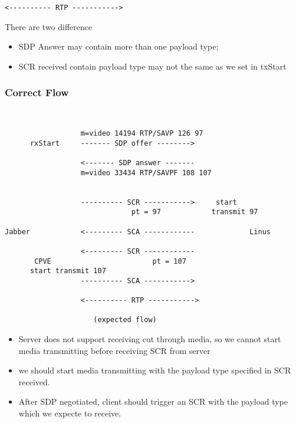 \documentclass{beamer}
\begin{document}
\begin{frame}[fragile]
\begin{center}
\begin{BVerbatim}[fontfamily=courier, fontsize=\relsize{-5}, commandchars=\\\{\}]
                                                                                        <---------- RTP ----------->            

\end{BVerbatim}
\end{center}
{
There are two difference 
\begin{itemize}
    \item SDP Answer may contain more than one payload type;
    \item SCR received contain payload type may not the same as we set in txStart
\end{itemize}
}
\end{frame}


\begin{frame}[fragile]
  \frametitle{Correct Flow}

\begin{center}
\begin{BVerbatim}[fontfamily=courier, fontsize=\relsize{-4}]


                  m=video 14194 RTP/SAVP 126 97                            
      rxStart     ------- SDP offer -------->        
                                            
                  <------- SDP answer -------      
                  m=video 33434 RTP/SAVPF 108 107


                  ---------- SCR ----------->     start    
                              pt = 97            transmit 97

Jabber            <--------- SCA ------------             Linus

                  <--------- SCR ------------        
       CPVE                        pt = 107
      start transmit 107 
                  ---------- SCA ----------->       

                  <---------- RTP ----------->        
                   
                     (expected flow)

\end{BVerbatim}
\end{center}

{
\begin{itemize}
    \item Server does not support receiving cut through media, so we cannot start media transmitting before receiving SCR from server
    \item we should start media transmitting with the payload type specified in SCR received.
    \item After SDP negotiated, client should trigger an SCR with the payload type which we expecte to receive. 
      
\end{itemize}
}
\end{frame}
\end{document}
